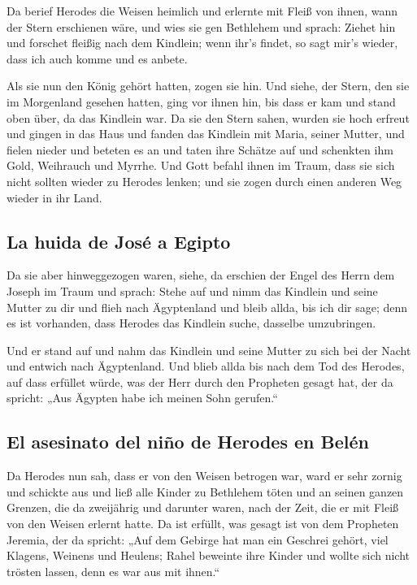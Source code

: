  Da berief Herodes die Weisen heimlich und erlernte mit
Fleiß von ihnen, wann der Stern erschienen wäre,  und wies
sie gen Bethlehem und sprach: Ziehet hin und forschet fleißig nach dem
Kindlein; wenn ihr's findet, so sagt mir's wieder, dass ich auch komme
und es anbete.

 Als sie nun den König gehört hatten, zogen sie hin. Und
siehe, der Stern, den sie im Morgenland gesehen hatten, ging vor ihnen
hin, bis dass er kam und stand oben über, da das Kindlein war.
 Da sie den Stern sahen, wurden sie hoch erfreut
 und gingen in das Haus und fanden das Kindlein mit
Maria, seiner Mutter, und fielen nieder und beteten es an und taten ihre
Schätze auf und schenkten ihm Gold, Weihrauch und Myrrhe.
 Und Gott befahl ihnen im Traum, dass sie sich nicht
sollten wieder zu Herodes lenken; und sie zogen durch einen anderen Weg
wieder in ihr Land.

\hypertarget{la-huida-de-josuxe9-a-egipto}{%
\subsection{La huida de José a
Egipto}\label{la-huida-de-josuxe9-a-egipto}}

 Da sie aber hinweggezogen waren, siehe, da erschien der
Engel des Herrn dem Joseph im Traum und sprach: Stehe auf und nimm das
Kindlein und seine Mutter zu dir und flieh nach Ägyptenland und bleib
allda, bis ich dir sage; denn es ist vorhanden, dass Herodes das
Kindlein suche, dasselbe umzubringen.

 Und er stand auf und nahm das Kindlein und seine Mutter
zu sich bei der Nacht und entwich nach Ägyptenland.  Und
blieb allda bis nach dem Tod des Herodes, auf dass erfüllet würde, was
der Herr durch den Propheten gesagt hat, der da spricht: „Aus Ägypten
habe ich meinen Sohn gerufen.``

\hypertarget{el-asesinato-del-niuxf1o-de-herodes-en-beluxe9n}{%
\subsection{El asesinato del niño de Herodes en
Belén}\label{el-asesinato-del-niuxf1o-de-herodes-en-beluxe9n}}

 Da Herodes nun sah, dass er von den Weisen betrogen war,
ward er sehr zornig und schickte aus und ließ alle Kinder zu Bethlehem
töten und an seinen ganzen Grenzen, die da zweijährig und darunter
waren, nach der Zeit, die er mit Fleiß von den Weisen erlernt hatte.
 Da ist erfüllt, was gesagt ist von dem Propheten
Jeremia, der da spricht:  „Auf dem Gebirge hat man ein
Geschrei gehört, viel Klagens, Weinens und Heulens; Rahel beweinte ihre
Kinder und wollte sich nicht trösten lassen, denn es war aus mit
ihnen.``


